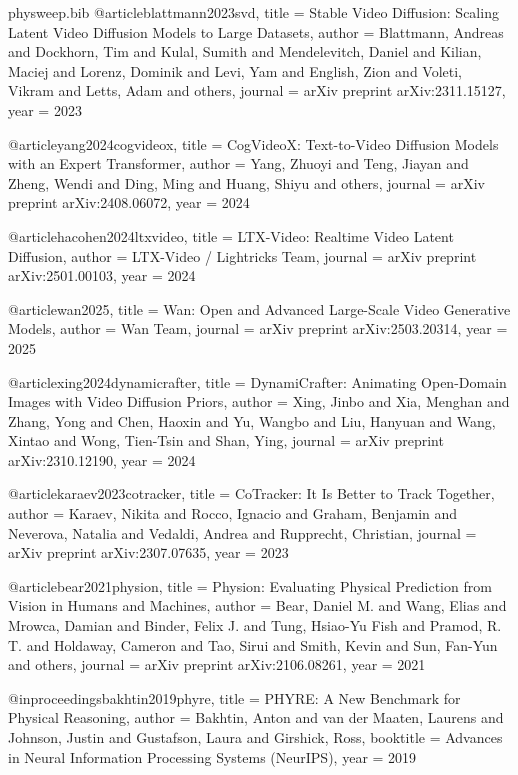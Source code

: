 \begin{filecontents}{physweep.bib}
@article{blattmann2023svd,
  title   = {Stable Video Diffusion: Scaling Latent Video Diffusion Models to Large Datasets},
  author  = {Blattmann, Andreas and Dockhorn, Tim and Kulal, Sumith and Mendelevitch, Daniel and Kilian, Maciej and Lorenz, Dominik and Levi, Yam and English, Zion and Voleti, Vikram and Letts, Adam and others},
  journal = {arXiv preprint arXiv:2311.15127},
  year    = {2023}
}

@article{yang2024cogvideox,
  title   = {{CogVideoX}: Text-to-Video Diffusion Models with an Expert Transformer},
  author  = {Yang, Zhuoyi and Teng, Jiayan and Zheng, Wendi and Ding, Ming and Huang, Shiyu and others},
  journal = {arXiv preprint arXiv:2408.06072},
  year    = {2024}
}

@article{hacohen2024ltxvideo,
  title   = {{LTX-Video}: Realtime Video Latent Diffusion},
  author  = {{LTX-Video / Lightricks Team}},
  journal = {arXiv preprint arXiv:2501.00103},
  year    = {2024}
}

@article{wan2025,
  title   = {{Wan}: Open and Advanced Large-Scale Video Generative Models},
  author  = {{Wan Team}},
  journal = {arXiv preprint arXiv:2503.20314},
  year    = {2025}
}

@article{xing2024dynamicrafter,
  title   = {{DynamiCrafter}: Animating Open-Domain Images with Video Diffusion Priors},
  author  = {Xing, Jinbo and Xia, Menghan and Zhang, Yong and Chen, Haoxin and Yu, Wangbo and Liu, Hanyuan and Wang, Xintao and Wong, Tien-Tsin and Shan, Ying},
  journal = {arXiv preprint arXiv:2310.12190},
  year    = {2024}
}

@article{karaev2023cotracker,
  title   = {{CoTracker}: It Is Better to Track Together},
  author  = {Karaev, Nikita and Rocco, Ignacio and Graham, Benjamin and Neverova, Natalia and Vedaldi, Andrea and Rupprecht, Christian},
  journal = {arXiv preprint arXiv:2307.07635},
  year    = {2023}
}

@article{bear2021physion,
  title   = {{Physion}: Evaluating Physical Prediction from Vision in Humans and Machines},
  author  = {Bear, Daniel M. and Wang, Elias and Mrowca, Damian and Binder, Felix J. and Tung, Hsiao-Yu Fish and Pramod, R. T. and Holdaway, Cameron and Tao, Sirui and Smith, Kevin and Sun, Fan-Yun and others},
  journal = {arXiv preprint arXiv:2106.08261},
  year    = {2021}
}

@inproceedings{bakhtin2019phyre,
  title     = {{PHYRE}: A New Benchmark for Physical Reasoning},
  author    = {Bakhtin, Anton and van der Maaten, Laurens and Johnson, Justin and Gustafson, Laura and Girshick, Ross},
  booktitle = {Advances in Neural Information Processing Systems (NeurIPS)},
  year      = {2019}
}


\end{filecontents}
